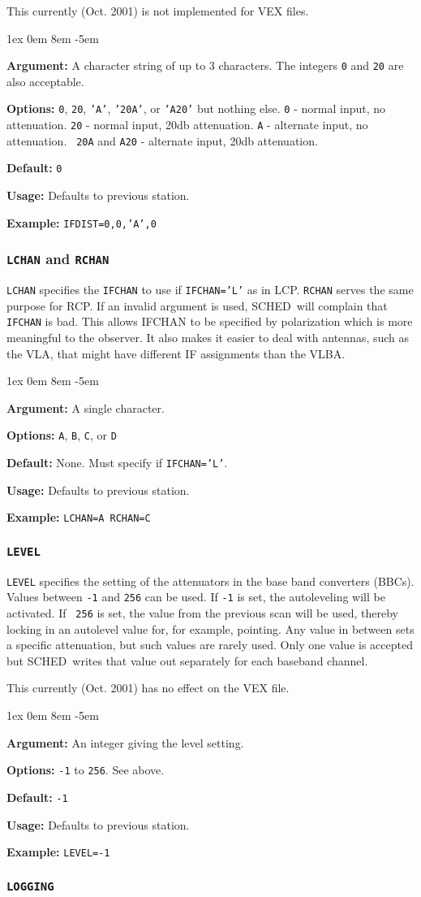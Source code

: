 \documentclass{report}
\newcommand{\schedb}{{\sc SCHED~}}
\newcommand{\rcwbox}[5]{
  \begin{list}{}{\parsep 1ex  \itemsep 0em
                 \leftmargin 8em  \itemindent -5em }
    \item {\bf Argument:} #1
    \item {\bf Options:}  #2
    \item {\bf Default:}  #3
    \item {\bf Usage:}    #4
    \item {\bf Example:}  #5
  \end{list}
}
\begin{document}
This currently (Oct. 2001) is not implemented for VEX files.

\rcwbox
{A character string of up to 3 characters. The integers {\tt 0} and
{\tt 20} are also acceptable.}
{{\tt 0}, {\tt 20}, {\tt 'A'}, {\tt '20A'}, or {\tt 'A20'} but nothing
else. {\tt 0} - normal input, no attenuation. {\tt 20} - normal input,
20db attenuation. {\tt A} - alternate input, no attenuation. {\tt
20A} and {\tt A20} - alternate input, 20db attenuation.}
{{\tt 0}}
{Defaults to previous station.}
{{\tt IFDIST=0,0,'A',0}}


\subsubsection{\label{SP:LCHAN}{\tt LCHAN} and {\tt RCHAN}}

{\tt LCHAN} specifies the {\tt IFCHAN} to use if {\tt IFCHAN='L'} as
in LCP.  {\tt RCHAN} serves the same purpose for RCP.  If an invalid
argument is used, \schedb will complain that {\tt IFCHAN} is bad.
This allows IFCHAN to be specified by polarization which is more
meaningful to the observer.  It also makes it easier to deal with
antennas, such as the VLA, that might have different IF assignments
than the VLBA.

\rcwbox
{A single character.}
{{\tt A}, {\tt B}, {\tt C}, or {\tt D}}
{None. Must specify if {\tt IFCHAN='L'}.}
{Defaults to previous station.}
{{\tt LCHAN=A  RCHAN=C}}


\subsubsection{\label{SP:LEVEL}{\tt LEVEL}}

{\tt LEVEL} specifies the setting of the attenuators in the base band
converters (BBCs). Values between {\tt -1} and {\tt 256} can be
used. If {\tt -1} is set, the autoleveling will be activated. If {\tt
256} is set, the value from the previous scan will be used, thereby
locking in an autolevel value for, for example, pointing. Any value in
between sets a specific attenuation, but such values are rarely
used. Only one value is accepted but \schedb writes that value out
separately for each baseband channel.

This currently (Oct. 2001) has no effect on the VEX file.


\rcwbox
{An integer giving the level setting.}
{{\tt -1} to {\tt 256}. See above.}
{{\tt -1}}
{Defaults to previous station.}
{{\tt LEVEL=-1}}


\subsubsection{\label{SP:LOGGING}{\tt LOGGING}}
\end{document}
